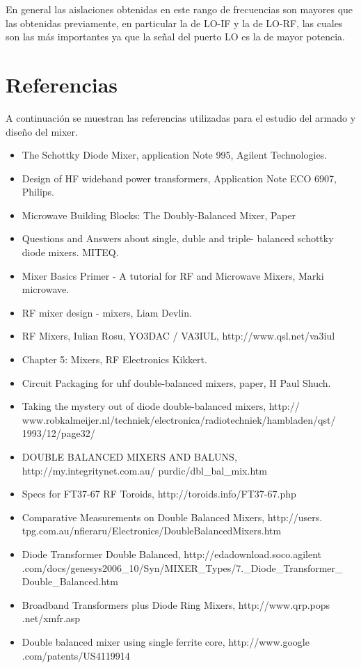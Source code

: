 \documentclass[a4paper,10pt]{article}
\begin{document}
	\indent En general las aislaciones obtenidas en este rango de frecuencias 
	son mayores que las obtenidas previamente, en particular la de LO-IF y la de
	LO-RF, las cuales son las m\'as importantes ya que la se\~nal del puerto LO 
	es la de mayor potencia.

	\newpage
	\section{Referencias}
	\indent A continuación se muestran las referencias utilizadas para el 
	estudio del armado y diseño del mixer.
	\begin{itemize}
		\item The Schottky Diode Mixer, application Note 995, Agilent 
		Technologies.
		\item Design of HF wideband power transformers, Application Note ECO 
		6907, Philips.
		\item Microwave Building Blocks: The Doubly-Balanced Mixer, Paper
		\item Questions and Answers about single, duble and triple- balanced 
		schottky diode mixers. MITEQ.
		\item Mixer Basics Primer - A tutorial for RF and Microwave Mixers, 
		Marki microwave.
		\item RF mixer design - mixers, Liam Devlin.
		\item RF Mixers, Iulian Rosu, YO3DAC / VA3IUL, http://www.qsl.net/va3iul
		\item Chapter 5: Mixers, RF Electronics Kikkert.
		\item Circuit Packaging for uhf double-balanced mixers, paper, H Paul 
		Shuch.
		\item Taking the mystery out of diode double-balanced mixers, http://
		www.robkalmeijer.nl/techniek/electronica/radiotechniek/hambladen/qst/
		1993/12/page32/
		\item DOUBLE BALANCED MIXERS AND BALUNS, http://my.integritynet.com.au/
		purdic/dbl\_bal\_mix.htm
		\item Specs for FT37-67 RF Toroids, http://toroids.info/FT37-67.php
		\item Comparative Measurements on Double Balanced Mixers, http://users.
		tpg.com.au/nfieraru/Electronics/DoubleBalancedMixers.htm
		\item Diode Transformer Double Balanced, http://edadownload.soco.agilent
		.com/docs/genesys2006\_10/Syn/MIXER\_Types/7.\_Diode\_Transformer\_
		Double\_Balanced.htm
		\item Broadband Transformers plus Diode Ring Mixers, http://www.qrp.pops
		.net/xmfr.asp
		\item Double balanced mixer using single ferrite core, http://www.google
		.com/patents/US4119914

	\end{itemize}
\end{document}
